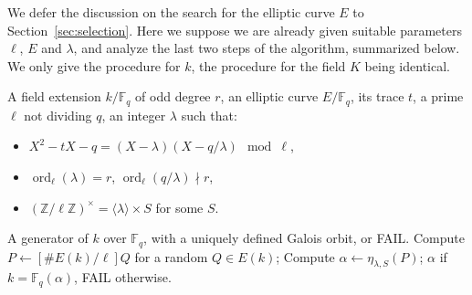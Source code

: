 \documentclass[12pt]{article}
\theoremstyle{plain}
\theoremstyle{definition}
\DeclareMathOperator{\order}{ord} %
\def\Z{\ensuremath{\mathbb{Z}}}
\def\F{\ensuremath{\mathbb{F}}}
\newcounter{algorithm}
\begin{document}
We defer the discussion on the search for the elliptic curve $E$ to
Section~\ref{sec:selection}. Here we suppose we are already given
suitable parameters $\ell$, $E$ and $\lambda$, and analyze the last
two steps of the algorithm, summarized below.  We only give the
procedure for $k$, the procedure for the field $K$ being
identical.

\begin{algorithm}
\label{algorithm:compell}
  \begin{algorithmic}[1]
    \REQUIRE A field extension $k/\F_q$ of odd degree $r$,
    an elliptic curve $E/\F_q$, its trace $t$, a prime $\ell$ not dividing $q$,
    an integer $\lambda$ such that:
    \begin{itemize}
    \item $X^2 - tX - q = (X-\lambda)(X-q/\lambda) \mod\ell$,
    \item $\order_\ell(\lambda)=r$, $\order_\ell(q/\lambda)\nmid r$,
    \item $(\Z/\ell\Z)^{\times} = \langle{\lambda}\rangle \times S$ for some $S$.
    \end{itemize}
    \ENSURE A generator of $k$ over $\F_q$, with a uniquely defined Galois orbit, or FAIL.
    \REPEAT
    \STATE Compute $P\leftarrow[\# E(k)/\ell]Q$ for a random $Q\in E(k)$;
    \STATE Compute $\alpha\leftarrow\eta_{\lambda,S}(P)$;
    \RETURN $\alpha$ if $k=\F_q(\alpha)$, FAIL otherwise.
  \end{algorithmic}
\end{algorithm}
\end{document}
